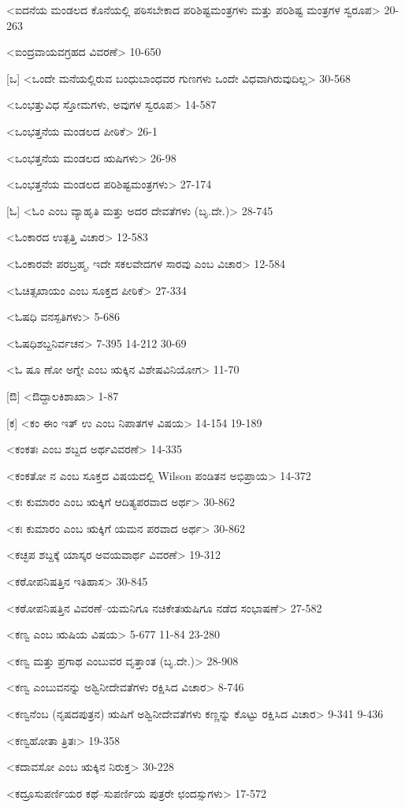 <ಐದನೆಯ ಮಂಡಲದ ಕೊನೆಯಲ್ಲಿ ಪಠಿಸಬೇಕಾದ ಪರಿಶಿಷ್ಟಮಂತ್ರಗಳು ಮತ್ತು ಪರಿಶಿಷ್ಟ ಮಂತ್ರಗಳ ಸ್ವರೂಪ>
20-263

<ಐಂದ್ರವಾಯವಗ್ರಹದ ವಿವರಣೆ>
10-650

[ಒ]
<ಒಂದೇ ಮನೆಯಲ್ಲಿರುವ ಬಂಧುಬಾಂಧವರ ಗುಣಗಳು ಒಂದೇ ವಿಧವಾಗಿರುವುದಿಲ್ಲ>
30-568

<ಒಂಭತ್ತುವಿಧ ಸ್ತೋಮಗಳು, ಅವುಗಳ ಸ್ವರೂಪ>
14-587

<ಒಂಭತ್ತನೆಯ ಮಂಡಲದ ಪೀಠಿಕೆ>
26-1

<ಒಂಭತ್ತನೆಯ ಮಂಡಲದ ಋಷಿಗಳು>
26-98

<ಒಂಭತ್ತನೆಯ ಮಂಡಲದ ಪರಿಶಿಷ್ಟಮಂತ್ರಗಳು>
27-174

[ಓ]
<ಓಂ ಎಂಬ ವ್ಯಾಹೃತಿ ಮತ್ತು ಅದರ ದೇವತೆಗಳು (ಬೃ.ದೇ.)>
28-745

<ಓಂಕಾರದ ಉತ್ಪತ್ತಿ ವಿಚಾರ>
12-583

<ಓಂಕಾರವೇ ಪರಬ್ರಹ್ಮ, ಇದೇ ಸಕಲವೇದಗಳ ಸಾರವು ಎಂಬ ವಿಚಾರ>
12-584

<ಓಚಿತ್ಸಖಾಯಂ ಎಂಬ ಸೂಕ್ತದ ಪೀಠಿಕೆ>
27-334

<ಓಷಧಿ ವನಸ್ಪತಿಗಳು>
5-686

<ಓಷಧಿಶಬ್ದನಿರ್ವಚನ>
7-395 
14-212 
30-69

<ಓ ಷೂ ಣೋ ಅಗ್ನೇ ಎಂಬ ಋಕ್ಕಿನ ವಿಶೇಷವಿನಿಯೋಗ>
11-70

[ಔ]
<ಔದ್ದಾಲಕಿಶಾಖಾ>
1-87

[ಕ]
<ಕಂ ಈಂ ಇತ್‍ ಉ ಎಂಬ ನಿಪಾತಗಳ ವಿಷಯ>
14-154 
19-189

<ಕಂಕತಃ ಎಂಬ ಶಬ್ದದ ಅರ್ಥವಿವರಣೆ>
14-335

<ಕಂಕತೋ ನ ಎಂಬ ಸೂಕ್ತದ ವಿಷಯದಲ್ಲಿ Wilson ಪಂಡಿತನ ಅಭಿಪ್ರಾಯ>
14-372

<ಕಃ ಕುಮಾರಂ ಎಂಬ ಋಕ್ಕಿಗೆ ಆದಿತ್ಯಪರವಾದ ಅರ್ಥ>
30-862

<ಕಃ ಕುಮಾರಂ ಎಂಬ ಋಕ್ಕಿಗೆ ಯಮನ ಪರವಾದ ಅರ್ಥ>
30-862

<ಕಚ್ಛಪ ಶಬ್ದಕ್ಕೆ ಯಾಸ್ಕರ ಅವಯವಾರ್ಥ ವಿವರಣೆ>
19-312

<ಕಠೋಪನಿಷತ್ತಿನ ಇತಿಹಾಸ>
30-845

<ಕಠೋಪನಿಷತ್ತಿನ ವಿವರಣೆ–ಯಮನಿಗೂ ನಚಿಕೇತಋಷಿಗೂ ನಡೆದ ಸಂಭಾಷಣೆ>
27-582

<ಕಣ್ವ ಎಂಬ ಋಷಿಯ ವಿಷಯ>
5-677 
11-84
23-280

<ಕಣ್ವ ಮತ್ತು ಪ್ರಗಾಥ ಎಂಬುವರ ವೃತ್ತಾಂತ (ಬೃ.ದೇ.)>
28-908

<ಕಣ್ವ ಎಂಬುವನನ್ನು ಅಶ್ವಿನೀದೇವತೆಗಳು ರಕ್ಷಿಸಿದ ವಿಚಾರ>
8-746

<ಕಣ್ವನೆಂಬ (ನೃಷದಪುತ್ರನ) ಋಷಿಗೆ ಅಶ್ವಿನೀದೇವತೆಗಳು ಕಣ್ಣನ್ನು ಕೊಟ್ಟು ರಕ್ಷಿಸಿದ ವಿಚಾರ>
9-341
9-436

<ಕಣ್ವಹೋತಾ ತ್ರಿತಃ>
19-358

<ಕದಾವಸೋ ಎಂಬ ಋಕ್ಕಿನ ನಿರುಕ್ತ>
30-228

<ಕದ್ರೂಸುಪರ್ಣಿಯರ ಕಥೆ–ಸುಪರ್ಣಿಯ ಪುತ್ರರೇ ಛಂದಸ್ಸುಗಳು>
17-572


